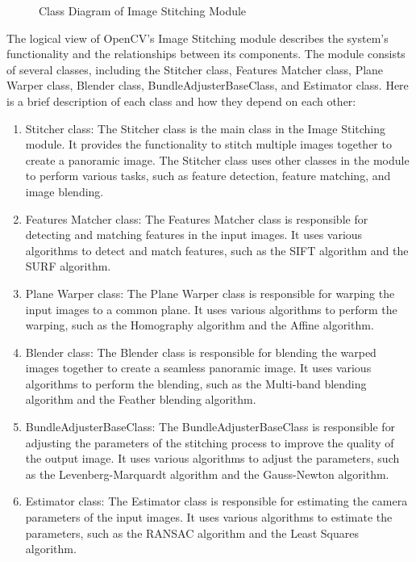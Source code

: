 \begin{figure}[H]
     \centering
     \caption{\label{Figure::BriefOverview} Class Diagram of Image Stitching Module \cite{smartdraw}}
\end{figure}
The logical view of OpenCV's Image Stitching module describes the system's functionality and the relationships between its components. The module consists of several classes, including the Stitcher class, Features Matcher class, Plane Warper class, Blender class, BundleAdjusterBaseClass, and Estimator class. Here is a brief description of each class and how they depend on each other:
\begin{enumerate}
    \item Stitcher class: The Stitcher class is the main class in the Image Stitching module. It provides the functionality to stitch multiple images together to create a panoramic image. The Stitcher class uses other classes in the module to perform various tasks, such as feature detection, feature matching, and image blending.
    \item Features Matcher class: The Features Matcher class is responsible for detecting and matching features in the input images. It uses various algorithms to detect and match features, such as the SIFT algorithm and the SURF algorithm.
    \item Plane Warper class: The Plane Warper class is responsible for warping the input images to a common plane. It uses various algorithms to perform the warping, such as the Homography algorithm and the Affine algorithm.
    \item Blender class: The Blender class is responsible for blending the warped images together to create a seamless panoramic image. It uses various algorithms to perform the blending, such as the Multi-band blending algorithm and the Feather blending algorithm.
    \item BundleAdjusterBaseClass: The BundleAdjusterBaseClass is responsible for adjusting the parameters of the stitching process to improve the quality of the output image. It uses various algorithms to adjust the parameters, such as the Levenberg-Marquardt algorithm and the Gauss-Newton algorithm.
    \item Estimator class: The Estimator class is responsible for estimating the camera parameters of the input images. It uses various algorithms to estimate the parameters, such as the RANSAC algorithm and the Least Squares algorithm.\\
\end{enumerate}
